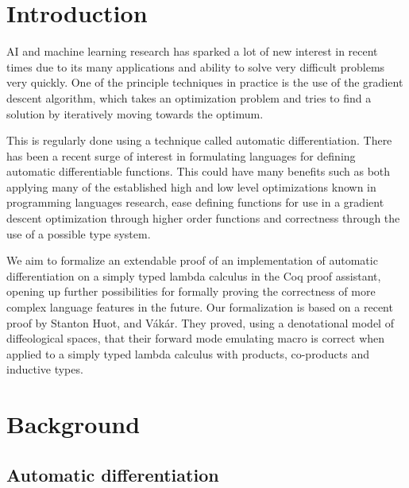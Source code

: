 \documentclass[a4, 12pt, final]{article}
\begin{document}
\newpage

\setcounter{page}{2}
\tableofcontents
\newpage

\section{Introduction}

AI and machine learning research has sparked a lot of new interest in recent times due to its many applications and ability to solve very difficult problems very quickly. One of the principle techniques in practice is the use of the gradient descent algorithm, which takes an optimization problem and tries to find a solution by iteratively moving towards the optimum.

This is regularly done using a technique called automatic differentiation. There has been a recent surge of interest in formulating languages for defining automatic differentiable functions. This could have many benefits such as both applying many of the established high and low level optimizations known in programming languages research, ease defining functions for use in a gradient descent optimization through higher order functions and correctness through the use of a possible type system.

We aim to formalize an extendable proof of an implementation of automatic differentiation on a simply typed lambda calculus in the Coq proof assistant, opening up further possibilities for formally proving the correctness of more complex language features in the future. Our formalization is based on a recent proof by Stanton Huot, and V\'{a}k\'{a}r\cite{huot2020correctness}. They proved, using a denotational model of diffeological spaces, that their forward mode emulating macro is correct when applied to a simply typed lambda calculus with products, co-products and inductive types.


\section{Background}

\subsection{Automatic differentiation}
\end{document}
